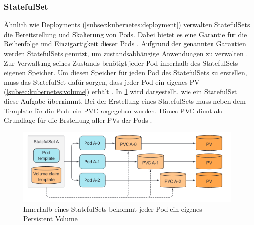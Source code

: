 \subsubsection{StatefulSet}
\label{subsec:kubernetes:statefulset}
Ähnlich wie Deployments (\ref{subsec:kubernetes:deployment}) verwalten StatefulSets die Bereitstellung und Skalierung von Pods.
Dabei bietet es eine Garantie für die Reihenfolge und Einzigartigkeit dieser Pods \cite{kubernetesStatefulSets}.
Aufgrund der genannten Garantien werden StatefulSets genutzt, um zustandsabhängige Anwendungen zu verwalten \cite{kubernetesStatefulSets}.
Zur Verwaltung seines Zustands benötigt jeder Pod innerhalb des StatefulSets eigenen Speicher.
Um diesen Speicher für jeden Pod des StatefulSets zu erstellen, muss das StatefulSet dafür sorgen, 
dass jeder Pod ein eigenes \ac{PV} (\ref{subsec:kubernetes:volume}) erhält \cite{Marko2018}.
In \ref{fig:kubernetes:statefulsets} wird dargestellt, wie ein StatefulSet diese Aufgabe übernimmt.
Bei der Erstellung eines StatefulSets muss neben dem Template für die Pods ein \ac{PVC} angegeben werden. 
Dieses \ac{PVC} dient als Grundlage für die Erstellung aller \acp{PV} der Pods \cite{Marko2018}.
\begin{figure}
  \centering
  \includegraphics[width=\textwidth]{gfx/chapters/2_grundlagen/statefulsets.png}
  \caption{Innerhalb eines StatefulSets bekommt jeder Pod ein eigenes Persistent Volume}
  \label{fig:kubernetes:statefulsets}
\end{figure}